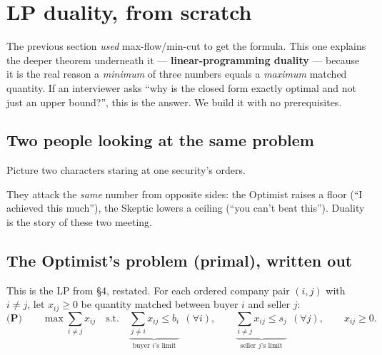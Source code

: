 \section{LP duality, from scratch}

The previous section \emph{used} max-flow/min-cut to get the formula. This one
explains the deeper theorem underneath it --- \textbf{linear-programming duality}
--- because it is the real reason a \emph{minimum} of three numbers equals a
\emph{maximum} matched quantity. If an interviewer asks ``why is the closed form
exactly optimal and not just an upper bound?'', this is the answer. We build it
with no prerequisites.

\subsection{Two people looking at the same problem}

Picture two characters staring at one security's orders.

\begin{center}
\end{center}

They attack the \emph{same} number from opposite sides: the Optimist raises a
floor (``I achieved this much''), the Skeptic lowers a ceiling (``you can't beat
this''). Duality is the story of these two meeting.

\subsection{The Optimist's problem (primal), written out}

This is the LP from \S4, restated. For each ordered company pair $(i,j)$ with
$i\neq j$, let $x_{ij}\ge0$ be quantity matched between buyer $i$ and seller $j$:
\[
\textbf{(P)}\qquad
\max \sum_{i\neq j} x_{ij}
\quad\text{s.t.}\quad
\underbrace{\sum_{j\neq i}x_{ij}\le b_i}_{\text{buyer }i\text{'s limit}}\ \ (\forall i),\qquad
\underbrace{\sum_{i\neq j}x_{ij}\le s_j}_{\text{seller }j\text{'s limit}}\ \ (\forall j),\qquad
x_{ij}\ge0.
\]


